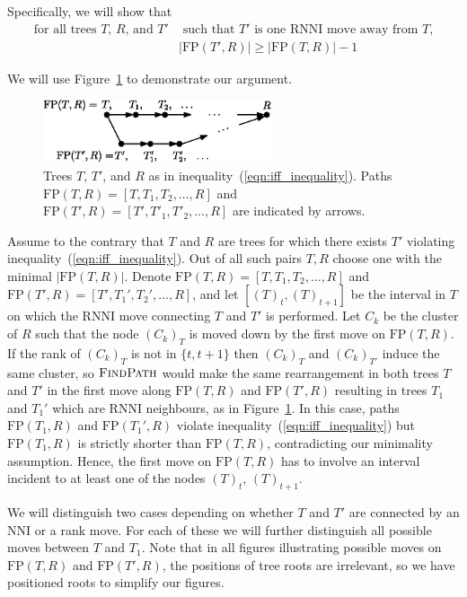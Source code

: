 \documentclass[11pt]{amsart}
\newcommand{\rnni}{\mathrm{RNNI}}
\newcommand{\findpath}{\textsc{FindPath}}
\newcommand{\nni}{\mathrm{NNI}}
\newcommand{\fp}{\mathrm{FP}}
\begin{document}
Specifically, we will show that
\begin{equation}
\begin{split}
\mbox{for all trees $T$, $R$, and $T'$}	& \mbox{ such that $T'$ is one $\rnni$ move away from $T$,}\\
					&|\fp(T',R)| \geq |\fp(T,R)| - 1
\end{split}
 \label{eqn:iff_inequality}
\end{equation}

We will use Figure~\ref{fig:proof_idea} to demonstrate our argument.

\begin{figure}[ht]
\centering
\includegraphics[width=0.6\textwidth]{proof_idea_ag}
\caption{Trees $T$, $T'$, and $R$ as in inequality~(\ref{eqn:iff_inequality}).
Paths $\fp(T,R) = [T,T_1,T_2, \ldots, R]$ and $\fp(T',R) = [T',T'_1,T'_2, \ldots, R]$ are indicated by arrows.}
\label{fig:proof_idea}
\end{figure}

Assume to the contrary that $T$ and $R$ are trees for which there exists $T'$ violating inequality~(\ref{eqn:iff_inequality}).
Out of all such pairs $T, R$ choose one with the minimal $|\fp(T, R)|$.
Denote $\fp(T,R) = [T, T_1, T_2, \ldots, R]$ and $\fp(T', R) = [T', T_1', T_2', \ldots, R]$, and let $[(T)_t, (T)_{t+1}]$ be the interval in $T$ on which the $\rnni$ move connecting $T$ and $T'$ is performed.
Let $C_k$ be the cluster of $R$ such that the node $(C_k)_T$ is moved down by the first move on $\fp(T, R)$.
If the rank of $(C_k)_T$ is not in $\{t, t+1\}$ then $(C_k)_T$ and $(C_k)_{T'}$ induce the same cluster, so $\findpath$ would make the same rearrangement in both trees $T$ and $T'$ in the first move along $\fp(T, R)$ and $\fp(T', R)$ resulting in trees $T_1$ and $T_1'$ which are $\rnni$ neighbours, as in Figure~\ref{fig:proof_idea}.
In this case, paths $\fp(T_1, R)$ and $\fp(T_1', R)$ violate inequality~(\ref{eqn:iff_inequality}) but $\fp(T_1, R)$ is strictly shorter than $\fp(T, R)$, contradicting our minimality assumption.
Hence, the first move on $\fp(T, R)$ has to involve an interval incident to at least one of the nodes $(T)_t$, $(T)_{t+1}$.

We will distinguish two cases depending on whether $T$ and $T'$ are connected by an $\nni$ or a rank move.
For each of these we will further distinguish all possible moves between $T$ and $T_1$.
Note that in all figures illustrating possible moves on $\fp(T,R)$ and $\fp(T',R)$, the positions of tree roots are irrelevant, so we have positioned roots to simplify our figures.
\end{document}
